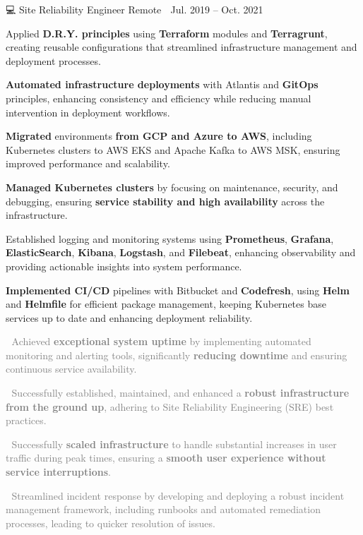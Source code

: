 \documentclass{awesome-cv}
\newcommand{\hll}[1]{\noindent\colorbox{light-gray}{\parbox{17.5cm}{\textcolor{gray}{#1}}}}
\begin{document}
{\begin{cventries}
        {💻 Site Reliability Engineer} %
        {Remote 📍} %
        {Jul. 2019 – Oct. 2021 📆} %
        {\begin{cvitems}
                \item{Applied \textbf{D.R.Y. principles} using \textbf{Terraform} modules and \textbf{Terragrunt}, creating reusable configurations that streamlined infrastructure management and deployment processes.}
                \item{\textbf{Automated infrastructure deployments} with Atlantis and \textbf{GitOps} principles, enhancing consistency and efficiency while reducing manual intervention in deployment workflows.}
                \item{\textbf{Migrated} environments \textbf{from GCP and Azure to AWS}, including Kubernetes clusters to AWS EKS and Apache Kafka to AWS MSK, ensuring improved performance and scalability.}
                \item{\textbf{Managed Kubernetes clusters} by focusing on maintenance, security, and debugging, ensuring \textbf{service stability and high availability} across the infrastructure.}
                \item{Established logging and monitoring systems using \textbf{Prometheus}, \textbf{Grafana}, \textbf{ElasticSearch}, \textbf{Kibana}, \textbf{Logstash}, and \textbf{Filebeat}, enhancing observability and providing actionable insights into system performance.}
                \item{\textbf{Implemented CI/CD} pipelines with Bitbucket and \textbf{Codefresh}, using \textbf{Helm} and \textbf{Helmfile} for efficient package management, keeping Kubernetes base services up to date and enhancing deployment reliability.}
                \\
                \newline
                \hll{🎯 Achieved \textbf{exceptional system uptime} by implementing automated monitoring and alerting tools, significantly \textbf{reducing downtime} and ensuring continuous service availability.}
                \hll{🎯 Successfully established, maintained, and enhanced a \textbf{robust infrastructure from the ground up}, adhering to Site Reliability Engineering (SRE) best practices.}
                \hll{🎯 Successfully \textbf{scaled infrastructure} to handle substantial increases in user traffic during peak times, ensuring a \textbf{smooth user experience without service interruptions}.}
                \hll{🎯 Streamlined incident response by developing and deploying a robust incident management framework, including runbooks and automated remediation processes, leading to quicker resolution of issues.}
            \end{cvitems}}


\end{cventries}}
\end{document}
